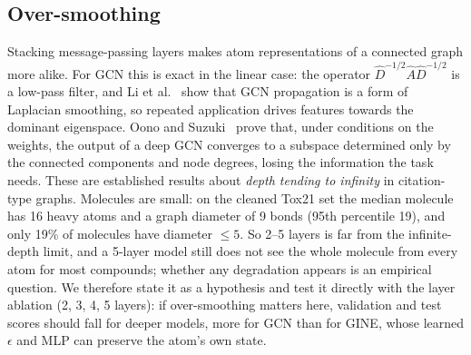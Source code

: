 \subsection{Over-smoothing}
Stacking message-passing layers makes atom representations of a connected graph more alike. For GCN this is exact in the linear case: the operator $\hat D^{-1/2}\hat A\hat D^{-1/2}$ is a low-pass filter, and Li et al.~\cite{li2018oversmooth} show that GCN propagation is a form of Laplacian smoothing, so repeated application drives features towards the dominant eigenspace. Oono and Suzuki~\cite{oono2020expressive} prove that, under conditions on the weights, the output of a deep GCN converges to a subspace determined only by the connected components and node degrees, losing the information the task needs. These are established results about \emph{depth tending to infinity} in citation-type graphs. Molecules are small: on the cleaned Tox21 set the median molecule has 16 heavy atoms and a graph diameter of 9 bonds (95th percentile 19), and only 19\% of molecules have diameter $\le5$. So 2--5 layers is far from the infinite-depth limit, and a 5-layer model still does not see the whole molecule from every atom for most compounds; whether any degradation appears is an empirical question. We therefore state it as a hypothesis and test it directly with the layer ablation (2, 3, 4, 5 layers): if over-smoothing matters here, validation and test scores should fall for deeper models, more for GCN than for GINE, whose learned $\epsilon$ and MLP can preserve the atom's own state.

